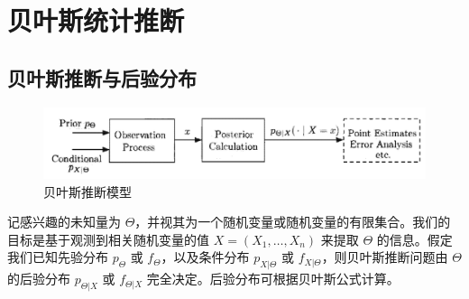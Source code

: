 \section{贝叶斯统计推断}


\subsection{贝叶斯推断与后验分布}

\begin{figure}[H]
    \centering
    \includegraphics[width=0.8\linewidth]{figs/贝叶斯推断模型.png}
    \caption{贝叶斯推断模型}
    \label{fig:bayesian-inference}
\end{figure}

记感兴趣的未知量为 $\Theta$，并视其为一个随机变量或随机变量的有限集合。我们的目标是基于观测到相关随机变量的值 $X=(X_1,\ldots,X_n)$ 来提取 $\Theta$ 的信息。假定我们已知先验分布 $p_\Theta$ 或 $f_\Theta$，以及条件分布 $p_{X\vert\Theta}$ 或 $f_{X\vert\Theta}$，则贝叶斯推断问题由 $\Theta$ 的后验分布 $p_{\Theta\vert X}$ 或 $f_{\Theta\vert X}$ 完全决定。后验分布可根据贝叶斯公式计算。

